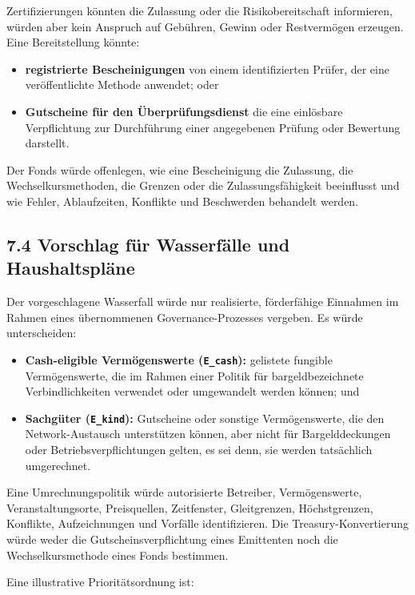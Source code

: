 \documentclass[11pt]{article}
\begin{document}
Zertifizierungen könnten die Zulassung oder die Risikobereitschaft informieren, würden aber kein Anspruch auf Gebühren, Gewinn oder Restvermögen erzeugen. Eine Bereitstellung könnte:

\begin{itemize}[leftmargin=*]
\item \textbf{registrierte Bescheinigungen} von einem identifizierten Prüfer, der eine veröffentlichte Methode anwendet; oder
\item \textbf{Gutscheine für den Überprüfungsdienst} die eine einlösbare Verpflichtung zur Durchführung einer angegebenen Prüfung oder Bewertung darstellt.
\end{itemize}
Der Fonds würde offenlegen, wie eine Bescheinigung die Zulassung, die Wechselkursmethoden, die Grenzen oder die Zulassungsfähigkeit beeinflusst und wie Fehler, Ablaufzeiten, Konflikte und Beschwerden behandelt werden.

\subsection*{7.4 Vorschlag für Wasserfälle und Haushaltspläne}

Der vorgeschlagene Wasserfall würde nur realisierte, förderfähige Einnahmen im Rahmen eines übernommenen Governance-Prozesses vergeben. Es würde unterscheiden:

\begin{itemize}[leftmargin=*]
\item \textbf{Cash-eligible Vermögenswerte (\texttt{E\_cash}):} gelistete fungible Vermögenswerte, die im Rahmen einer Politik für bargeldbezeichnete Verbindlichkeiten verwendet oder umgewandelt werden können; und
\item \textbf{Sachgüter (\texttt{E\_kind}):} Gutscheine oder sonstige Vermögenswerte, die den Network-Austausch unterstützen können, aber nicht für Bargelddeckungen oder Betriebsverpflichtungen gelten, es sei denn, sie werden tatsächlich umgerechnet.
\end{itemize}
Eine Umrechnungspolitik würde autorisierte Betreiber, Vermögenswerte, Veranstaltungsorte, Preisquellen, Zeitfenster, Gleitgrenzen, Höchstgrenzen, Konflikte, Aufzeichnungen und Vorfälle identifizieren. Die Treasury-Konvertierung würde weder die Gutscheinsverpflichtung eines Emittenten noch die Wechselkursmethode eines Fonds bestimmen.

Eine illustrative Prioritätsordnung ist:
\end{document}
